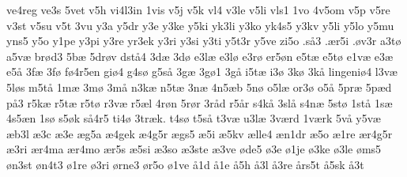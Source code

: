 {ve4reg
ve3s
5vet
v5h
vi4l3in
1vis
v5j
v5k
vl4
v3le
v5li
vls1
1vo
4v5om
v5p
v5re
v3st
v5su
v5t
3vu
y3a
y5dr
y3e
y3ke
y5ki
yk3li
y3ko
yk4s5
y3kv
y5li
y5lo
y5mu
yns5
y5o
y1pe
y3pi
y3re
yr3ek
y3ri
y3si
y3ti
y5t3r
y5ve
zi5o
.så3
.ær5i
.øv3r
a3tø
a5væ
brød3
5bæ
5drøv
dstå4
3dæ
3dø
e3læ
e3lø
e3rø
er5øn
e5tæ
e5tø
e1væ
e3æ
e5å
3fæ
3fø
fø4r5en
giø4
g4sø
g5så
3gæ
3gø1
3gå
i5tæ
i3ø
3kø
3kå
lingeniø4
l3væ
5løs
m5tå
1mæ
3mø
3må
n3kæ
n5tæ
3næ
4n5æb
5nø
o5læ
or3ø
o5å
5præ
5pæd
på3
r5kæ
r5tæ
r5tø
r3væ
r5æl
4røn
5rør
3råd
r5år
s4kå
3slå
s4næ
5stø
1stå
1sæ
4s5æn
1sø
s5øk
så4r5
ti4ø
3træk.
t4sø
t5så
t3væ
u3læ
3værd
1værk
5vå
y5væ
æb3l
æ3c
æ3e
æg5a
æ4gek
æ4g5r
ægs5
æ5i
æ5kv
ælle4
æn1dr
æ5o
æ1re
ær4g5r
æ3ri
ær4ma
ær4mo
ær5s
æ5si
æ3so
æ3ste
æ3ve
øde5
ø3e
ø1je
ø3ke
ø3le
øms5
øn3st
øn4t3
ø1re
ø3ri
ørne3
ør5o
ø1ve
å1d
å1e
å5h
å3l
å3re
års5t
å5sk
å3t
}
